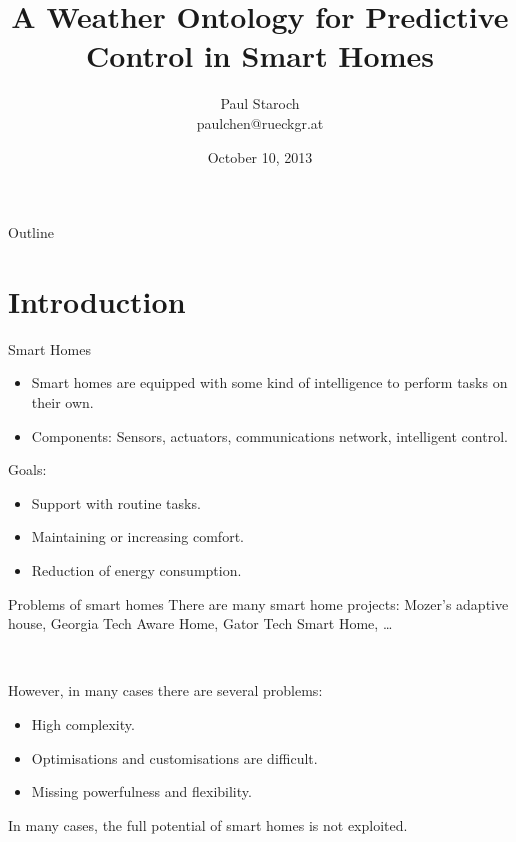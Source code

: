 \documentclass{beamer}
\title %
{A Weather Ontology for Predictive Control in Smart Homes}
\author[Paul Staroch] %
{Paul Staroch\\ {\scriptsize paulchen@rueckgr.at}} %
\institute[Vienna University of Technology] %
{
  Arbeitsgruppe Automatisierungssysteme\\
  Institut für Rechnergestützte Automation\\

  \hspace{5em}

  Supervisors:\\
  Ao.Univ.-Prof. Dipl.-Ing. Dr.techn. Wolfgang Kastner\\
  Dipl.-Ing. Mario Kofler

}
\date %
{October 10, 2013}
\begin{document}
\newcommand{\smarthomeweather}{\emph{Smart\-Home\-Weather}\xspace}

\begin{frame}
  \titlepage
\end{frame}

\begin{frame}{Outline}
  \tableofcontents
\end{frame}




\section{Introduction}

\begin{frame}{Smart Homes}
	\begin{itemize}
		\item Smart homes are equipped with some kind of intelligence to perform tasks on their own.
		\item Components: Sensors, actuators, communications network, intelligent control.
	\end{itemize}

	Goals:
	\begin{itemize}
		\item Support with routine tasks.
		\item Maintaining or increasing comfort.
		\item Reduction of energy consumption.
	\end{itemize}
\end{frame}

\begin{frame}{Problems of smart homes}
	There are many smart home projects: Mozer's adaptive house, Georgia Tech Aware Home, Gator Tech Smart Home, …

	~

	However, in many cases there are several problems:
	\begin{itemize}
		\item High complexity.
		\item Optimisations and customisations are difficult.
		\item Missing powerfulness and flexibility.
	\end{itemize}

	In many cases, the full potential of smart homes is not exploited.
\end{frame}
\end{document}
